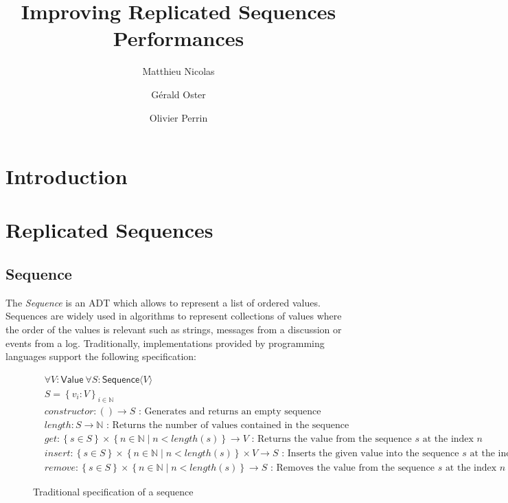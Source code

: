 \documentclass{article}
\newcommand{\fnspec}[3]{#1: #2 \text{ : #3}}
\newcommand{\inbb}[1]{\in \mathbb{#1}}
\newcommand{\mathlist}[2]{\set{#1_i: #2}_{i \inbb{N}}}
\newcommand{\set}[1]{\left\{#1\right\}} %
\newcommand{\ssep}{\mid} %
\newcommand{\tuple}[1]{\langle #1 \rangle}
\theoremstyle{definition}
\newcounter{note-counter}
\theoremstyle{definition}
\theoremstyle{definition}
\begin{document}
\title{Improving Replicated Sequences Performances}
\author{Matthieu Nicolas}
\author{Gérald Oster}
\author{Olivier Perrin}
\date{}

\maketitle

\section{Introduction}

\section{Replicated Sequences}

\subsection{Sequence}

The \emph{Sequence} is an \ac{ADT} which allows to represent a list of ordered values.
Sequences are widely used in algorithms to represent collections of values where the order of the values is relevant such as strings, messages from a discussion or events from a log.
Traditionally, implementations provided by programming languages support the following specification:

\begin{figure}[h]
    \begin{align*}
    &\forall V: \mathsf{Value} \ \forall S: \mathsf{Sequence} \tuple{V}\\
    &S = \mathlist{v}{V}\\
    &\fnspec{constructor}{\left( \right) \to S}{Generates and returns an empty sequence}\\
    &\fnspec{length}{S \to \mathbb{N}}{Returns the number of values contained in the sequence}\\
    &\fnspec{get}{\set{s \in S} \times \set{ n \inbb{N} \ssep n < length(s) } \to V}{Returns the value from the sequence $s$ at the index $n$}\\
    &\fnspec{insert}{\set{s \in S} \times \set{ n \inbb{N} \ssep n < length(s) } \times V \to S}{Inserts the given value into the sequence $s$ at the index $n$ and ... }\\ %
    &\fnspec{remove}{\set{s \in S} \times \set{ n \inbb{N} \ssep n < length(s) } \to S}{Removes the value from the sequence $s$ at the index $n$ and returns ... }%
    \end{align*}
    \caption{Traditional specification of a sequence}
    \label{fig:spec-seq}
\end{figure}
\\
\end{document}
